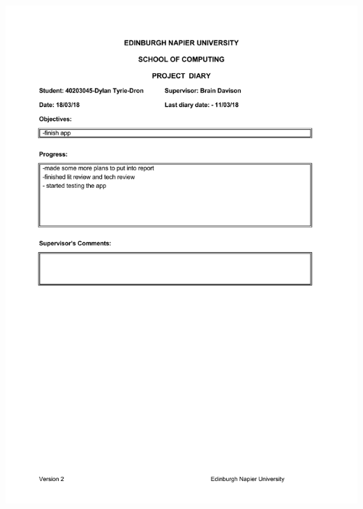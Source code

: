 \documentclass[12pt,a4paper]{article}
\begin{document}
\begin{appendices}
\includegraphics[width=\textwidth,height=\textheight,keepaspectratio]{project_diary_14th_entry.pdf}

\end{appendices}
\end{document}

